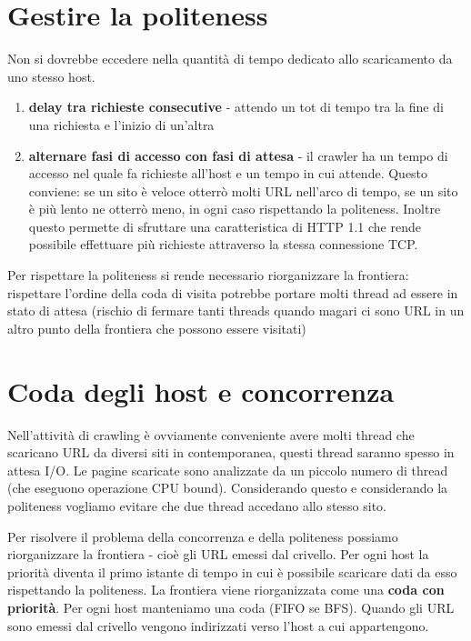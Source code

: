 \documentclass[12pt,italian]{report}
\begin{document}
\section{Gestire la politeness}
\label{sec:gestire la politeness}
Non si dovrebbe eccedere nella quantità di tempo dedicato allo scaricamento da uno stesso host. 

\begin{enumerate}
    \item \textbf{delay tra richieste consecutive} - attendo un tot di tempo tra la fine di una richiesta e l'inizio di un'altra
    \item \textbf{alternare fasi di accesso con fasi di attesa} - il crawler ha un tempo di accesso nel quale fa richieste all'host e un tempo in cui attende. Questo conviene: se un sito è veloce otterrò molti URL nell'arco di tempo, se un sito è più lento ne otterrò meno, in ogni caso rispettando la politeness. Inoltre questo permette di sfruttare una caratteristica di HTTP 1.1 che rende possibile effettuare più richieste attraverso la stessa connessione TCP.
\end{enumerate}

Per rispettare la politeness si rende necessario riorganizzare la frontiera: rispettare l'ordine della coda di visita potrebbe portare molti thread ad essere in stato di attesa (rischio di fermare tanti threads quando magari ci sono URL in un altro punto della frontiera che possono essere visitati)

\section{Coda degli host e concorrenza}
\label{sec:coda degli host e concorrenza}
Nell'attività di crawling è ovviamente conveniente avere molti thread che scaricano URL da diversi siti in contemporanea, questi thread saranno spesso in attesa I/O. Le pagine scaricate sono analizzate da un piccolo numero di thread (che eseguono operazione CPU bound). Considerando questo e considerando la politeness vogliamo evitare che due thread accedano allo stesso sito.

Per risolvere il problema della concorrenza e della politeness possiamo riorganizzare la frontiera - cioè gli URL emessi dal crivello. Per ogni host la priorità diventa il primo istante di tempo in cui è possibile scaricare dati da esso rispettando la politeness. La frontiera viene riorganizzata come una \textbf{coda con priorità}. Per ogni host manteniamo una coda (FIFO se BFS). Quando gli URL sono emessi dal crivello vengono indirizzati verso l'host a cui appartengono. 
\end{document}
